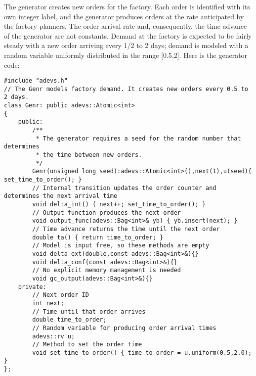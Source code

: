 The generator creates new orders for the factory. Each order is identified with its own integer label, and the generator produces orders at the rate anticipated by the factory planners. The order arrival rate and, consequently, the time advance of the generator are not constants. Demand at the factory is expected to be fairly steady with a new order arriving every 1/2 to 2 days; demand is modeled with a random variable uniformly distributed in the range [0.5,2]. Here is the generator code:
\begin{verbatim}
#include "adevs.h"
// The Genr models factory demand. It creates new orders every 0.5 to 2 days.
class Genr: public adevs::Atomic<int>
{
    public:
        /**
         * The generator requires a seed for the random number that determines
         * the time between new orders.
         */
        Genr(unsigned long seed):adevs::Atomic<int>(),next(1),u(seed){ set_time_to_order(); }
        // Internal transition updates the order counter and determines the next arrival time
        void delta_int() { next++; set_time_to_order(); }
        // Output function produces the next order
        void output_func(adevs::Bag<int>& yb) { yb.insert(next); }
        // Time advance returns the time until the next order
        double ta() { return time_to_order; }
        // Model is input free, so these methods are empty
        void delta_ext(double,const adevs::Bag<int>&){}
        void delta_conf(const adevs::Bag<int>&){}
        // No explicit memory management is needed
        void gc_output(adevs::Bag<int>&){}
    private:
        // Next order ID
        int next;
        // Time until that order arrives
        double time_to_order;
        // Random variable for producing order arrival times
        adevs::rv u;
        // Method to set the order time
        void set_time_to_order() { time_to_order = u.uniform(0.5,2.0); }
};
\end{verbatim} 

